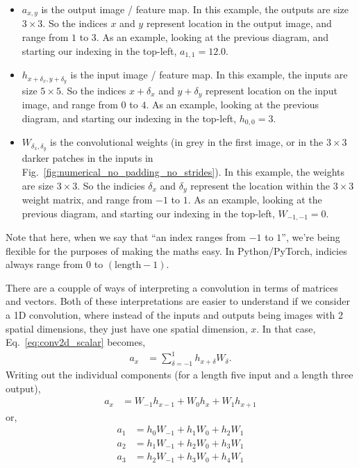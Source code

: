 \documentclass{article}
\begin{document}
\begin{itemize}
  \item $a_{x, y}$ is the output image / feature map. In this example, the outputs are size $3\times 3$. So the indices $x$ and $y$ represent location in the output image, and range from $1$ to $3$.  As an example, looking at the previous diagram, and starting our indexing in the top-left, $a_{1, 1} = 12.0$.
  \item $h_{x+\delta_x, y+\delta_y}$ is the input image / feature map. In this example, the inputs are size $5\times 5$.  So the indices $x + \delta_x$ and $y + \delta_y$ represent location on the input image, and range from $0$ to $4$.  As an example, looking at the previous diagram, and starting our indexing in the top-left, $h_{0, 0} = 3$.
  \item $W_{\delta_x, \delta_y}$ is the convolutional weights (in grey in the first image, or in the $3 \times 3$ darker patches in the inputs in Fig.~\ref{fig:numerical_no_padding_no_strides}).  In this example, the weights are size $3 \times 3$. So the indicies $\delta_x$ and $\delta_y$ represent the location within the $3 \times 3$ weight matrix, and range from $-1$ to $1$. As an example, looking at the previous diagram, and starting our indexing in the top-left, $W_{-1, -1} = 0$.
\end{itemize}
Note that here, when we say that ``an index ranges from $-1$ to $1$'', we're being flexible for the purposes of making the maths easy.
In Python/PyTorch, indicies always range from $0$ to $(\text{length}-1)$.

There are a coupple of ways of interpreting a convolution in terms of matrices and vectors.
Both of these interpretations are easier to understand if we consider a 1D convolution, where instead of the inputs and outputs being images with 2 spatial dimensions, they just have one spatial dimension, $x$.
In that case, Eq.~\eqref{eq:conv2d_scalar} becomes,
\begin{align}
  \label{eq:conv1d_scalar}
  a_{x} &= \sum_{\delta=-1}^1 h_{x+\delta} W_{\delta}.
\end{align}
Writing out the individual components (for a length five input and a length three output),
\begin{align}
  \label{eq:conv1d_scalar_sum}
  a_{x} &= W_{-1} h_{x-1} + W_0 h_x + W_1 h_{x+1}
\end{align}
or,
\begin{subequations}
\label{eq:conv1d_scalar_components}
\begin{align}
  a_1 &= h_0 W_{-1} + h_1 W_{0} + h_2 W_{1}\\
  a_2 &= h_1 W_{-1} + h_2 W_{0} + h_3 W_{1} \\
  a_3 &= h_2 W_{-1} + h_3 W_{0} + h_4 W_{1}
\end{align}
\end{subequations}
\end{document}
